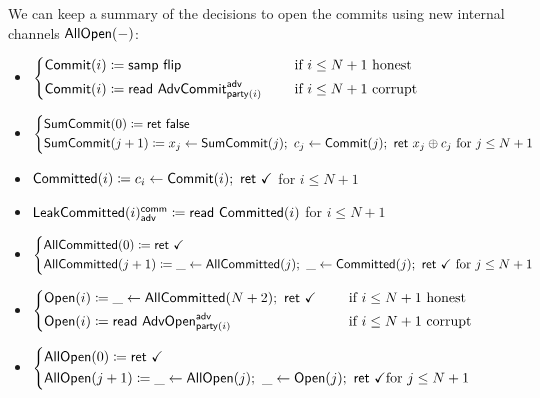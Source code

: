 \noindent We can keep a summary of the decisions to open the commits using new internal channels $\mathsf{AllOpen}(-)$:

\begin{itemize}
\item {\color{blue} $\begin{cases*} \Commit(i) \coloneqq \samp{\flip} & \hspace{10pt} \text{if $i \leq N+1$ honest} \\ \Commit(i) \coloneqq \read{\AdvCommit^\adv_{\party(i)}} & \hspace{10pt} \text{if $i \leq N+1$ corrupt} \end{cases*}$}
\item {\color{blue} $\begin{cases*} \SumCommit(0) \coloneqq \ret{\false} \\ \SumCommit(j+1) \coloneqq x_j \leftarrow \SumCommit(j); \ c_j \leftarrow \Commit(j); \ \ret{x_j \oplus c_j} \text{ for $j \leq N+1$} \end{cases*}$}
\item {\color{magenta} $\mathsf{Committed}(i) \coloneqq c_i \leftarrow \mathsf{Commit}(i); \ \mathsf{ret} \ \checkmark$ for $i \leq N+1$}
\item {\color{magenta} $\mathsf{LeakCommitted}(i)^{\mathsf{comm}}_{\mathsf{adv}} \coloneqq \mathsf{read} \ \mathsf{Committed}(i)$ for $i \leq N+1$}
\item {\color{magenta} $\begin{cases*} \AllCommitted(0) \coloneqq \ret{\checkmark} \\ \AllCommitted(j+1) \coloneqq \_ \leftarrow \AllCommitted(j); \ \_ \leftarrow \Committed(j); \ \ret{\checkmark} \text{ for $j \leq N+1$} \end{cases*}$}
\item {\color{teal} $\begin{cases*} \Open(i) \coloneqq \_ \leftarrow \AllCommitted(N+2); \ \ret{\checkmark} & \hspace{10pt} \text{if $i \leq N+1$ honest} \\ \Open(i) \coloneqq \read{\AdvOpen^\adv_{\party(i)}} & \hspace{10pt} \text{if $i \leq N+1$ corrupt} \end{cases*}$}
\item {\color{teal} $\begin{cases*} \AllOpen(0) \coloneqq \ret{\checkmark} \\ \AllOpen(j+1) \coloneqq \_ \leftarrow \AllOpen(j); \ \_ \leftarrow \Open(j); \ \ret{\checkmark} \text{for $j \leq N+1$} \end{cases*}$}

\end{itemize}
